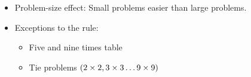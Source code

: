 
\begin{slide*}

\vspace{0.5cm}
\vspace{1cm}

\begin{itemize}
\item Problem-size effect: Small problems easier than large problems.

\item Exceptions to the rule:\\
\begin{itemize}
\item Five and nine times table
\item Tie problems $(\mbox{$2\times2$},\mbox{$3\times3$}\ldots\mbox{$9\times9$})$
\end{itemize}

\end{itemize}


\end{slide*}


